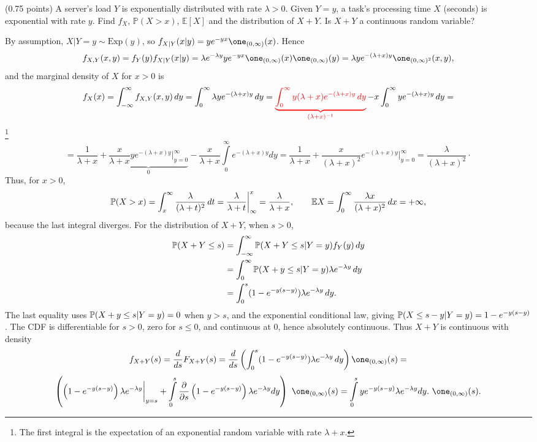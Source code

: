 \documentclass[a4paper]{report}
\begin{document}
\begin{problem} (0.75 points)
A server's load $Y$ is exponentially distributed with rate $\lambda>0$. Given $Y=y$, a task's processing time $X$ (seconds) is exponential with rate $y$. Find $f_X$, $\mathbb P(X>x)$, $\mathbb E[X]$ and the distribution of $X+Y$. Is $X+Y$ a continuous random variable?
\end{problem}
By assumption, $X|Y=y\sim\mbox{Exp}(y)$, so $f_{X|Y}(x|y)=ye^{-yx}\one_{(0,\infty)}(x)$. Hence $$f_{X,Y}(x,y)=f_Y(y)f_{X|Y}(x|y)=\lambda e^{-\lambda y}ye^{-yx}\one_{(0,\infty)}(x)\one_{(0,\infty)}(y)=\lambda ye^{-(\lambda+x)y}\one_{(0,\infty)^2}(x,y),$$ and the marginal density of $X$ for $x>0$ is
$$f_X(x)=\int_{-\infty}^{\infty}f_{X,Y}(x,y)\,dy=\int_0^\infty\lambda ye^{-(\lambda+x)y}\,dy=\color{red}\underbrace{\int_0^\infty y(\lambda+x)e^{-(\lambda+x)y}\,dy}_{(\lambda+x)^{-1}}\color{black}-x\int_0^\infty ye^{-(\lambda+x)y}\,dy=$$\footnote{The first integral is the expectation of an exponential random variable with rate $\lambda+x$.}
$$= \frac{1}{\lambda+x}+\underbrace{\frac{x}{\lambda+x}ye^{-(\lambda + x)y}\bigg\rvert_{y=0}^{\infty}}_{0}-\frac{x}{\lambda+x}\int\limits_{0}^{\infty}e^{-(\lambda + x)y}dy =\frac{1}{\lambda+x}+\frac{x}{(\lambda+x)^2}e^{-(\lambda + x)y}\bigg\rvert_{y=0}^{\infty} = \frac{\lambda}{(\lambda+x)^2}\cdot$$
Thus, for $x>0$, $$\P(X>x)=\int_x^\infty\frac{\lambda}{(\lambda+t)^2}\,dt=\frac{\lambda}{\lambda+t}\bigg|_\infty^x=\frac{\lambda}{\lambda+x},\qquad \E X=\int_0^\infty\frac{\lambda x}{(\lambda+x)^2}\,dx=+\infty,$$
because the last integral diverges. For the distribution of $X+Y$, when $s>0$,
\begin{align*}
\P(X+Y\leq s)
&=\int_{-\infty}^\infty\P(X+Y\leq s|Y=y)f_Y(y)\,dy\\
&=\int_0^\infty\P(X+y\leq s|Y=y)\lambda e^{-\lambda y}\,dy\\
&=\int_0^s(1-e^{-y(s-y)})\lambda e^{-\lambda y}\,dy.
\end{align*} The last equality uses $\P(X+y\leq s|Y=y)=0$ when $y>s$, and the exponential conditional law, giving $\P(X\leq s-y|Y=y)=1-e^{-y(s-y)}$. The CDF is differentiable for $s>0$, zero for $s\leq0$, and continuous at 0, hence absolutely continuous. Thus $X+Y$ is continuous with density $$f_{X+Y}(s)=\frac{d}{ds}F_{X+Y}(s)=\frac{d}{ds}\left(\int_0^s(1-e^{-y(s-y)})\lambda e^{-\lambda y}\,dy\right)\one_{(0,\infty)}(s)=$$
$$\left(\left(1-e^{-y(s-y)}\right)\lambda e^{-\lambda y}\bigg\rvert_{y=s}+\int\limits_{0}^{s}\frac{\partial}{\partial s}\left(1-e^{-y(s-y)}\right)\lambda e^{-\lambda y}dy\right)~\one_{(0, \infty)}(s) = \int\limits_{0}^{s}ye^{-y(s-y)}\lambda e^{-\lambda y}dy.~\one_{(0, \infty)}(s).$$
\end{document}
